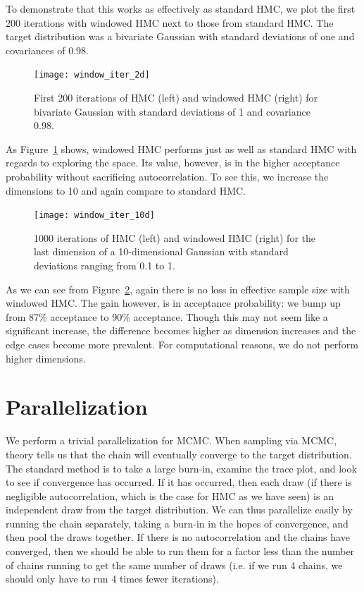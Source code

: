 \documentclass{article}
\numberwithin{equation}{section}
\begin{document}
To demonstrate that this works as effectively as standard HMC, we plot the first 200 iterations with windowed HMC next to those from standard HMC. The target distribution was a bivariate Gaussian with standard deviations of one and covariances of 0.98.

\begin{figure}[H]
\centering
  \texttt{[image: window\_iter\_2d]}
  \caption{First 200 iterations of HMC (left) and windowed HMC (right) for bivariate Gaussian with standard deviations of 1 and covariance 0.98.}
\label{window_2d}
\end{figure}

As Figure~\ref{window_2d} shows, windowed HMC performs just as well as standard HMC with regards to exploring the space. Its value, however, is in the higher acceptance probability without sacrificing autocorrelation. To see this, we increase the dimensions to 10 and again compare to standard HMC.

\begin{figure}[H]
\centering
  \texttt{[image: window\_iter\_10d]}
  \caption{1000 iterations of HMC (left) and windowed HMC (right) for the last dimension of a 10-dimensional Gaussian with standard deviations ranging from 0.1 to 1.}
\label{window_10d}
\end{figure}

As we can see from Figure~\ref{window_10d}, again there is no loss in effective sample size with windowed HMC. The gain however, is in acceptance probability: we bump up from 87\% acceptance to 90\% acceptance. Though this may not seem like a significant increase, the difference becomes higher as dimension increases and the edge cases become more prevalent. For computational reasons, we do not perform higher dimensions.

\section{Parallelization}
We perform a trivial parallelization for MCMC. When sampling via MCMC, theory tells us that the chain will eventually converge to the target distribution. The standard method is to take a large burn-in, examine the trace plot, and look to see if convergence has occurred. If it has occurred, then each draw (if there is negligible autocorrelation, which is the case for HMC as we have seen) is an independent draw from the target distribution.  We can thus parallelize easily by running the chain separately, taking a burn-in in the hopes of convergence, and then pool the draws together. If there is no autocorrelation and the chains have converged, then we should be able to run them for a factor less than the number of chains running to get the same number of draws (i.e. if we run 4 chains, we should only have to run 4 times fewer iterations).\\
\end{document}

